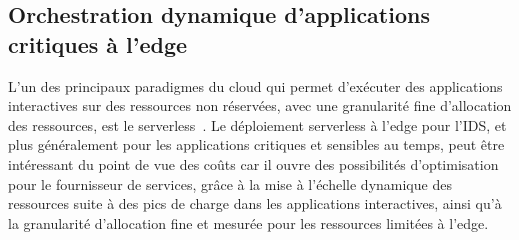 \subsection{Orchestration dynamique d'applications critiques à l'edge}

L'un des principaux paradigmes du cloud qui permet d'exécuter des applications interactives sur des ressources non réservées, avec une granularité fine d'allocation des ressources, est le serverless~\cite{Lannurien2023}. Le déploiement serverless à l'edge pour l'\gls{IDS}, et plus généralement pour les applications critiques et sensibles au temps, peut être intéressant du point de vue des coûts car il ouvre des possibilités d'optimisation pour le fournisseur de services, grâce à la mise à l'échelle dynamique des ressources suite à des pics de charge dans les applications interactives, ainsi qu'à la granularité d'allocation fine et mesurée pour les ressources limitées à l'edge.


